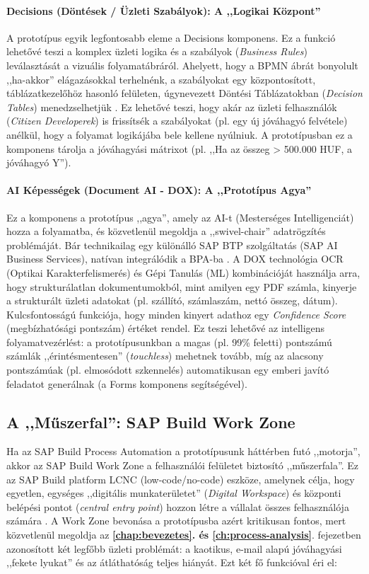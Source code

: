\paragraph{Decisions (Döntések / Üzleti Szabályok): A ,,Logikai Központ''}
A prototípus egyik legfontosabb eleme a Decisions komponens.
Ez a funkció lehetővé teszi a komplex üzleti logika és a szabályok (\textit{Business Rules}) leválasztását a vizuális folyamatábráról.
Ahelyett, hogy a BPMN ábrát bonyolult ,,ha-akkor'' elágazásokkal terhelnénk, a szabályokat egy központosított, táblázatkezelőhöz hasonló felületen, úgynevezett Döntési Táblázatokban (\textit{Decision Tables}) menedzselhetjük \cite{SAP-Build}.
Ez lehetővé teszi, hogy akár az üzleti felhasználók (\textit{Citizen Developerek}) is frissítsék a szabályokat (pl. egy új jóváhagyó felvétele) anélkül, hogy a folyamat logikájába bele kellene nyúlniuk.
A prototípusban ez a komponens tárolja a jóváhagyási mátrixot (pl. ,,Ha az összeg > 500.000 HUF, a jóváhagyó Y'').
\paragraph{AI Képességek (Document AI - DOX): A ,,Prototípus Agya''}
Ez a komponens a prototípus ,,agya'', amely az AI-t (Mesterséges Intelligenciát) hozza a folyamatba, és közvetlenül megoldja a ,,swivel-chair'' adatrögzítés problémáját.
Bár technikailag egy különálló SAP BTP szolgáltatás (SAP AI Business Services), natívan integrálódik a BPA-ba \cite{SAP-Build}.
A DOX technológia OCR (Optikai Karakterfelismerés) és Gépi Tanulás (ML) kombinációját használja arra, hogy strukturálatlan dokumentumokból, mint amilyen egy PDF számla, kinyerje a strukturált üzleti adatokat (pl. szállító, számlaszám, nettó összeg, dátum).
Kulcsfontosságú funkciója, hogy minden kinyert adathoz egy \textit{Confidence Score} (megbízhatósági pontszám) értéket rendel.
Ez teszi lehetővé az intelligens folyamatvezérlést: a prototípusunkban a magas (pl. 99\% feletti) pontszámú számlák ,,érintésmentesen'' (\textit{touchless}) mehetnek tovább, míg az alacsony pontszámúak (pl. elmosódott szkennelés) automatikusan egy emberi javító feladatot generálnak (a Forms komponens segítségével).


\subsection{A ,,Műszerfal'': SAP Build Work Zone}
\label{ssec:work_zone}

Ha az SAP Build Process Automation a prototípusunk háttérben futó ,,motorja'', akkor az SAP Build Work Zone a felhasználói felületet biztosító ,,műszerfala''.
Ez az SAP Build platform LCNC (low-code/no-code) eszköze, amelynek célja, hogy egyetlen, egységes ,,digitális munkaterületet'' (\textit{Digital Workspace}) és központi belépési pontot (\textit{central entry point}) hozzon létre a vállalat összes felhasználója számára \cite{SAP-Work-Zone}.
A Work Zone bevonása a prototípusba azért kritikusan fontos, mert közvetlenül megoldja az \textbf{\ref{chap:bevezetes}. és \ref{ch:process-analysis}}.
fejezetben azonosított két legfőbb üzleti problémát: a kaotikus, e-mail alapú jóváhagyási ,,fekete lyukat'' és az átláthatóság teljes hiányát.
Ezt két fő funkcióval éri el:

